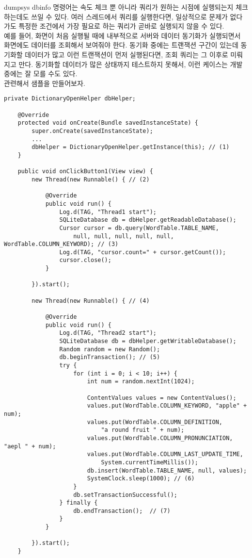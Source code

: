 dumpsys dbinfo 명령어는 속도 체크 뿐 아니라 쿼리가 원하는 시점에 실행되는지 체크하는데도 쓰일 수 있다.
여러 스레드에서 쿼리를 실행한다면, 일상적으로 문제가 없다가도 특정한 조건에서 가장 필요로 하는 쿼리가 곧바로 실행되지 않을 수 있다.\\

예를 들어, 화면이 처음 실행될 때에 내부적으로 서버와 데이터 동기화가 실행되면서 화면에도 데이터를 조회해서 보여줘야 한다. 
동기화 중에는 트랜잭션 구간이 있는데 동기화할 데이터가 많고 이런 트랜잭션이 먼저 실행된다면, 조회 쿼리는 그 이후로 미뤄지고 만다. 
동기화할 데이터가 많은 상태까지 테스트하지 못해서, 이런 케이스는 개발 중에는 잘 모를 수도 있다.\\

관련해서 샘플을 만들어보자.
\begin{lstlisting}[frame=single] 
	private DictionaryOpenHelper dbHelper;

	@Override
	protected void onCreate(Bundle savedInstanceState) {
		super.onCreate(savedInstanceState);
		...
		dbHelper = DictionaryOpenHelper.getInstance(this); // (1)
	}

	public void onClickButton1(View view) {
		new Thread(new Runnable() { // (2)

			@Override
			public void run() {
				Log.d(TAG, "Thread1 start");
				SQLiteDatabase db = dbHelper.getReadableDatabase();
				Cursor cursor = db.query(WordTable.TABLE_NAME, 
					null, null, null, null, null, WordTable.COLUMN_KEYWORD); // (3)
				Log.d(TAG, "cursor.count=" + cursor.getCount());
				cursor.close();
			}

		}).start();
		
		new Thread(new Runnable() { // (4)

			@Override
			public void run() {
				Log.d(TAG, "Thread2 start");
				SQLiteDatabase db = dbHelper.getWritableDatabase();
				Random random = new Random();
				db.beginTransaction(); // (5)
				try {
					for (int i = 0; i < 10; i++) {
						int num = random.nextInt(1024);

						ContentValues values = new ContentValues();
						values.put(WordTable.COLUMN_KEYWORD, "apple" + num);
						values.put(WordTable.COLUMN_DEFINITION, 
							"a round fruit " + num);
						values.put(WordTable.COLUMN_PRONUNCIATION, "aepl " + num);
						values.put(WordTable.COLUMN_LAST_UPDATE_TIME,
							System.currentTimeMillis());
						db.insert(WordTable.TABLE_NAME, null, values);
						SystemClock.sleep(1000); // (6)
					}
					db.setTransactionSuccessful();
				} finally {
					db.endTransaction();  // (7)
				}
			}

		}).start();
	}
\end{lstlisting}	
